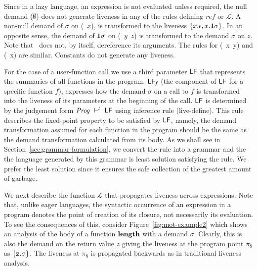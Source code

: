 \documentclass[9pt]{sigplanconf}
\begin{document}
 Since  in a  lazy language,  an  expression is  not evaluated  unless
 required, the null demand ($\emptyset$) does not generate liveness in
 any  of  the  rules  defining  $\mathit{ref}$  or  $\mathcal{L}$.   A
 non-null  demand of  $\sigma$ on  (\CDR~$x$), is  transformed  to the
 liveness $\{x.\epsilon, x.\mathbf{1}\sigma\}$.   In an opposite sense, the
 demand  of $\mathbf{1}\sigma$  on  (\CONS~$y$~$z$) is  transformed to  the
 demand  $\sigma$ on  $z$.   Note  that \CONS\  does  not, by  itself,
 dereference its  arguments. The rules for  (\PRIM~x~y) and (\NULLQ~x)
 are similar. Constants do not generate any liveness.

For  the  case  of a  user-function  call  we  use a  third  parameter
$\mathsf{LF}$  that  represents the  summaries  of  all  functions in  the
program.   $\mathsf{LF}_{\mathit f}$  (the  component of  $\mathsf{LF}$ for  a
specific function $f$), expresses how the demand $\sigma$ on a call to
$f$  is  transformed  into  the  liveness of  its  parameters  at  the
beginning of the call.  $\mathsf{LF}$  is determined by the judgement form
$\mathit{Prog} \ \vdash^l\  \mathsf{LF}$ using inference rule ({\sc live-define}).
This  rule  describes the  fixed-point  property  to  be satisfied  by
$\mathsf{LF}$, namely, the demand transformation assumed for each function
in  the  program should  be  the  same  as the  demand  transformation
calculated    from    its    body.      As    we    shall    see    in
Section~\ref{sec:grammar-formulation},  we  convert  the rule  into  a
grammar  and the  the  language  generated by  this  grammar is  least
solution satisfying  the rule. We  prefer the least solution  since it
ensures the safe collection of the greatest amount of garbage.

We next  describe the function $\mathcal{L}$  that propagates liveness
across expressions.  Note that,  unlike eager languages, the syntactic
occurrence  of an expression  in a  program denotes  the point  of
creation of its closure, not necessarily its evaluation.
To see the  consequences of this, consider
Figure~\ref{fig:mot-example2} which shows an analysis  of the body of
a function $\mathbf{length}$ with a demand $\sigma$.  Clearly, this is also the
demand on the return value $z$ giving the liveness at the program point
$\pi_8$ as $\{\mbox{\tt z}.\sigma\}$.  The liveness at $\pi_8$ is propagated
backwards as in traditional liveness analysis.
\end{document}
